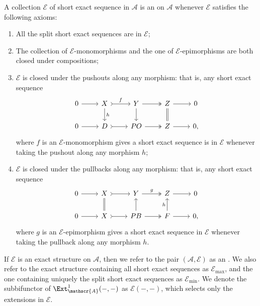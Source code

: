 \begin{definition}\label{def:exact}
A collection $\mathcal{E}$ of short exact sequence in $\mathscr{A}$ is an  on $\mathscr{A}$ whenever $\mathcal{E}$ satisfies the following axioms:
\begin{enumerate}[label=$(\mathsf{ES} \arabic*)$,itemsep=1mm]
    \item \label{ES1} All the split short exact sequences are in $\mathcal{E}$;
  
    \item \label{ES2} The collection of $\mathcal{E}$-monomorphisms and the one of $\mathcal{E}$-epimorphisms are both closed under compositions;
    
    \item\label{ES3} $\mathcal{E}$ is closed under the pushouts along any morphism: that is, any short exact sequence \[\begin{tikzcd}
	0 & X & Y & Z & 0 \\ 0 & D & PO & Z & 0 ,
	\arrow[from=1-1, to=1-2]
	\arrow["f",tail, from=1-2, to=1-3]
	\arrow[two heads,from=1-3, to=1-4]
	\arrow[from=1-4, to=1-5]
    \arrow[from=2-1, to=2-2]
	\arrow[tail, from=2-2, to=2-3]
	\arrow[two heads,from=2-3, to=2-4]
	\arrow[from=2-4, to=2-5]
    \arrow["h",from=1-2, to=2-2]
	\arrow[from=1-3, to=2-3]
    \arrow[equal,from=1-4, to=2-4]
 \end{tikzcd} \] where $f$ is an $\mathcal{E}$-monomorphism gives a short exact sequence is in $\mathcal{E}$ whenever taking the pushout along any morphism $h$;
    
\item \label{ES4} $\mathcal{E}$ is closed under the pullbacks along any morphism: that is, any short exact sequence \[\begin{tikzcd}
	0 & X & Y & Z & 0 \\ 0 & X & PB & F & 0 ,
	\arrow[from=1-1, to=1-2]
	\arrow[tail, from=1-2, to=1-3]
	\arrow["g",two heads,from=1-3, to=1-4]
	\arrow[from=1-4, to=1-5]
    \arrow[from=2-1, to=2-2]
	\arrow[tail, from=2-2, to=2-3]
	\arrow[two heads,from=2-3, to=2-4]
	\arrow[from=2-4, to=2-5]
    \arrow[equal,from=1-2, to=2-2]
	\arrow[from=2-3, to=1-3]
    \arrow["h",from=2-4, to=1-4]
 \end{tikzcd} \]where $g$ is an $\mathcal{E}$-epimorphism gives a short exact sequence in $\mathcal{E}$ whenever taking the pullback along any morphism $h$.
\end{enumerate}
If $\mathcal{E}$ is an exact structure on $\mathscr{A}$, then we refer to the pair $(\mathscr{A},\mathcal{E})$ as an . We also refer to the exact structure containing all short exact sequences as $\mathcal{E}_{\max}$, and the one containing uniquely the split short exact sequences as $\mathcal{E}_{\min}$. We denote the subbifunctor of $\Ext^1_\mathscr{A}(-,-)$ as $\mathcal{E}(-,-)$, which selects only the extensions in $\mathcal{E}$. 
\end{definition}

